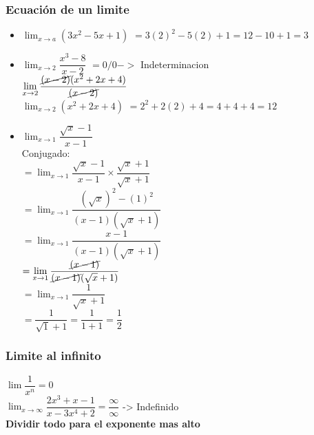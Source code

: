 \documentclass[stu, 12pt, letterpaper, donotrepeattitle, floatsintext, natbib]{apa7}
\begin{document}
    \subsubsection{Ecuación de un limite}
    \begin{itemize}
        \item $\displaystyle\lim_{x \to a} (3x^2 -5x +1)$
        \hspace{2cm} $= 3(2)^2-5(2)+1 = 12-10+1 = 3$ \\[0.5cm]

        \item $\displaystyle\lim_{x \to 2} \dfrac{x^3-8}{x-2}$ \hspace{3cm} $=0/0 ->$ Indeterminacion \\[0.5cm]
        $\displaystyle\lim_{x \to 2}\dfrac{\cancel{(x-2)}(x^2+2x+4)}{\cancel{(x-2)}}$\\[0.5cm]
        $\displaystyle\lim_{x \to 2}(x^2+2x+4)$\hspace{1cm} $= 2^2+2(2)+4 = 4+4+4 = 12$\\[0.5cm]

        \item $\displaystyle\lim_{x\to 1} \dfrac{\sqrt {x}-1}{x-1}$\\[0.5cm]
        Conjugado: \\[0.5cm]
        $ = \displaystyle\lim_{x\to1} \dfrac{\sqrt {x}-1}{x-1} \times \dfrac{\sqrt {x}+1}{\sqrt {x}+1}$\\[0.5cm]
        $ = \displaystyle\lim_{x\to1} \dfrac{(\sqrt {x})^2 - (1)^2}{(x-1)(\sqrt {x}+1)}$\\[0.5cm]
        $ = \displaystyle\lim_{x\to1} \dfrac{x-1}{(x-1)(\sqrt {x}+1)}$\\[0.5cm]
        $ = \displaystyle\lim_{x\to1} \dfrac{\cancel{(x-1)}}{\cancel{(x-1)}(\sqrt {x}+1)}$\\[0.5cm]
        $ = \displaystyle\lim_{x\to1} \dfrac{1}{\sqrt {x}+1}$\\[0.5cm]
        $ = \dfrac{1}{\sqrt {1}+1} = \dfrac{1}{1+1} = \dfrac{1}{2}$\\[0.5cm]
    \end{itemize}

    \subsubsection{Limite al infinito}
    $\displaystyle\lim \dfrac{1}{x^n} = 0$ \\[0.5cm]
    $\displaystyle\lim_{x \to \infty} \dfrac{2x^3+x-1}{x-3x^4+2} = \dfrac{\infty}{\infty} $\hspace{2cm} -> Indefinido\\[0.5cm]
    \textbf{Dividir todo para el exponente mas alto}\\[0.5cm]




    \renewcommand\refname{\large\textbf{Referencias}}
%    
    
\end{document}
